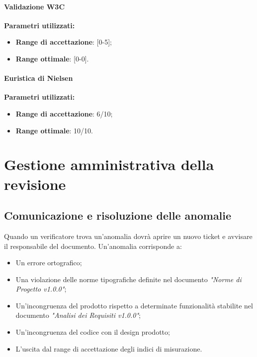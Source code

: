 \documentclass[12pt,a4paper,titlepage]{article}
\begin{document}
			\paragraph{Validazione W3C}
			\textbf{Parametri utilizzati:}
			\begin{itemize}
				\item \textbf{Range di accettazione}: [0-5];
				\item \textbf{Range ottimale}: [0-0].
			\end{itemize}
			
			\paragraph{Euristica di Nielsen}
			\textbf{Parametri utilizzati:}
			\begin{itemize}
				\item \textbf{Range di accettazione}: 6/10;
				\item \textbf{Range ottimale}: 10/10.
			\end{itemize}
			
	\newpage
	\section{Gestione amministrativa della revisione}
		\subsection{Comunicazione e risoluzione delle anomalie}
		Quando un verificatore trova un'anomalia dovrà aprire un nuovo ticket e avvisare il responsabile del documento. Un'anomalia corrisponde a:
		\begin{itemize}
			\item Un errore ortografico;
			\item Una violazione delle norme tipografiche definite nel documento \textit{"Norme di Progetto v1.0.0"}; 
			\item Un'incongruenza del prodotto rispetto a determinate funzionalità stabilite nel documento \textit{"Analisi dei Requisiti v1.0.0"};
			\item Un'incongruenza del codice con il design prodotto;
			\item L'uscita dal range di accettazione degli indici di misurazione.
		\end{itemize}
	
	\newpage
\end{document}
